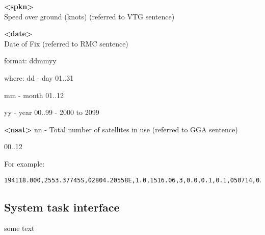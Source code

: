 \textbf{<spkn>} \\
Speed over ground (knots) (referred to VTG sentence)

\textbf{<date>} \\
Date of Fix (referred to RMC sentence)

format:
ddmmyy 
						
where:
dd - day					
01..31

mm - month					
01..12

yy - year						
00..99 - 2000 to 2099

\textbf{<nsat>}
nn - Total number of satellites in use (referred to GGA sentence)
						
00..12

For example:
\begin{lstlisting}
194118.000,2553.37745S,02804.20558E,1.0,1516.06,3,0.0,0.1,0.1,050714,07
\end{lstlisting}

\subsection{System task interface}
some text
    
    
    
    
    